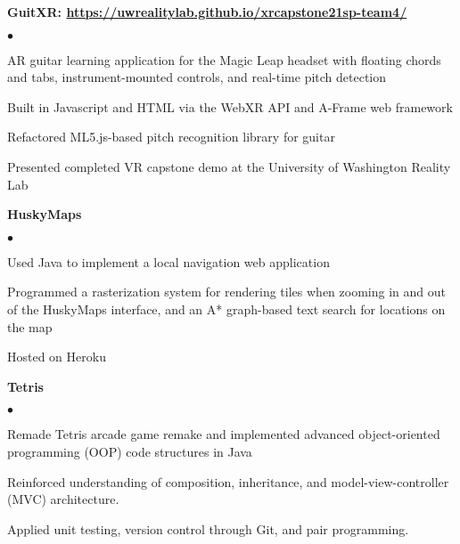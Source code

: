 \documentclass[margin,line]{res}
\newenvironment{list2}{
  \begin{list}{$\bullet$}{%
      \setlength{\itemsep}{0in}
      \setlength{\parsep}{0in} \setlength{\parskip}{0in}
      \setlength{\topsep}{0in} \setlength{\partopsep}{0in} 
      \setlength{\leftmargin}{0.2in}}}{\end{list}}
\begin{document}
\begin{resume}

{\bf GuitXR: \url{https://uwrealitylab.github.io/xrcapstone21sp-team4/}} %
\begin{list2}
\item AR guitar learning application for the Magic Leap headset with floating chords and tabs, instrument-mounted controls, and real-time pitch detection
\item Built in Javascript and HTML via the WebXR API and A-Frame web framework
\item Refactored ML5.js-based pitch recognition library for guitar 
\item Presented completed VR capstone demo at the University of Washington Reality Lab
\end{list2}

{\bf HuskyMaps} %
\begin{list2}
	\item Used Java to implement a local navigation web application
	\item Programmed a rasterization system for rendering tiles when zooming in and out of the HuskyMaps interface, and an A* graph-based text search for locations on the map
	\item Hosted on Heroku
\end{list2}

{\bf Tetris} %
\begin{list2}
\item Remade Tetris arcade game remake and implemented advanced object-oriented programming (OOP) code structures in Java
\item Reinforced understanding of composition, inheritance, and model-view-controller (MVC) architecture. 
\item Applied unit testing, version control through Git, and pair programming.
\end{list2}



\end{resume}
\end{document}
